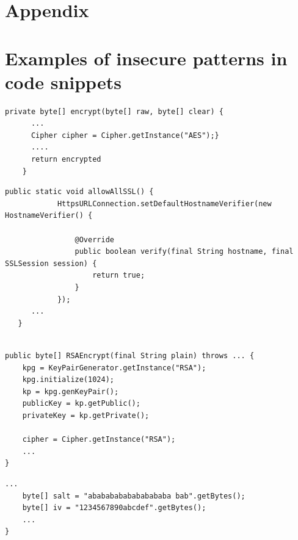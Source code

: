 \section*{Appendix}
\label{sec:appendix}
\section{Examples of insecure patterns in code snippets}

\begin{lstlisting}[caption={A code snippet showing insecure use of AES default encryption mode ECB.}, label={fig:aes-encryption-example}]
    private byte[] encrypt(byte[] raw, byte[] clear) {
      ...
      Cipher cipher = Cipher.getInstance("AES");}
      ....
      return encrypted
    }
     \end{lstlisting}

\begin{lstlisting}[caption={A code snippet showing insecure use of Absence of performing hostname verification.}, 
label={listing:Absence-of-performing-hostname-verification}]
   public static void allowAllSSL() {
            HttpsURLConnection.setDefaultHostnameVerifier(new HostnameVerifier() {

                @Override
                public boolean verify(final String hostname, final SSLSession session) {
                    return true;
                }
            });
      ...
   }
\end{lstlisting}

\begin{lstlisting}[caption={A code snippet showing insecure use of weak key length.}, 
label={listing:Weak-key-length}]

public byte[] RSAEncrypt(final String plain) throws ... {
    kpg = KeyPairGenerator.getInstance("RSA");
    kpg.initialize(1024);
    kp = kpg.genKeyPair();
    publicKey = kp.getPublic();
    privateKey = kp.getPrivate();

    cipher = Cipher.getInstance("RSA");
    ... 
}
\end{lstlisting}

\begin{lstlisting}[caption={A code snippet showing insecure use of static predictable IV.}, 
label={listing:Static-constant-predictable-keys-IV}]
    ...
    byte[] salt = "abababababababababa bab".getBytes();
    byte[] iv = "1234567890abcdef".getBytes();
    ... 
}
\end{lstlisting}

